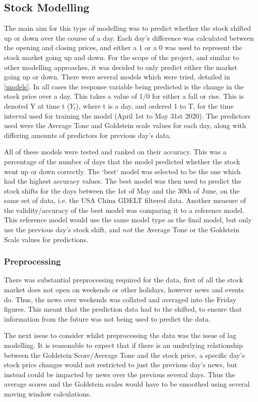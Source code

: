 \subsection{Stock Modelling}
The main aim for this type of modelling was to predict whether the stock shifted up or down over the course of a day. Each day's difference was calculated between the opening and closing prices, and either a 1 or a 0 was used to represent the stock market going up and down. For the scope of the project, and similar to other modelling approaches, it was decided to only predict either the market going up or down. There were several models which were tried, detailed in \ref{models}. In all cases the response variable being predicted is the change in the stock price over a day. This takes a value of 1/0 for either a fall or rise. This is denoted Y at time t ($Y_{t}$), where t is a day, and ordered 1 to T, for the time interval used for training the model (April 1st to May 31st 2020). The predictors used were the Average Tone and Goldstein scale values for each day, along with differing amounts of predictors for previous day's data.

All of these models were tested and ranked on their accuracy. This was a percentage of the number of days that the model predicted whether the stock went up or down correctly. The `best` model was selected to be the one which had the highest accuracy values. The best model was then used to predict the stock shifts for the days between the 1st of May and the 30th of June, on the same set of data, i.e. the USA China GDELT filtered data. Another measure of the validity/accuracy of the best model was comparing it to a reference model. This reference model would use the same model type as the final model, but only use the previous day's stock shift, and \textit{not} the Average Tone or the Goldstein Scale values for predictions. 

\subsubsection{Preprocessing}
There was substantial preprocessing required for the data, first of all the stock market does not open on weekends or other holidays, however news and events do. Thus, the news over weekends was collated and averaged into the Friday figures. This meant that the prediction data had to the shifted, to ensure that information from the future was not being used to predict the data.

The next issue to consider whilst preprocessing the data was the issue of lag modelling. It is reasonable to expect that if there is an underlying relationship between the Goldstein Score/Average Tone and the stock price, a specific day's stock price changes would not restricted to just the previous day's news, but instead could be impacted by news over the previous several days. Thus the average scores and the Goldstein scales would have to be smoothed using several moving window calculations.


